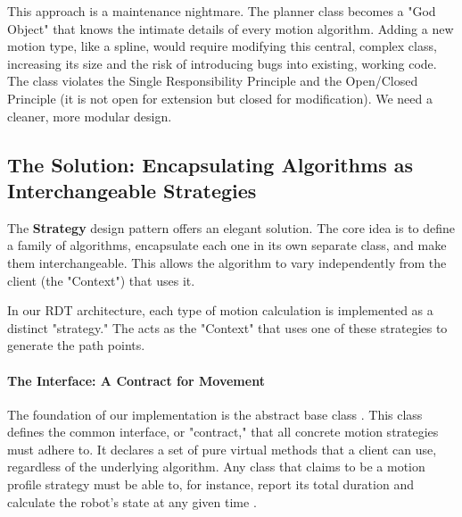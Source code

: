 This approach is a maintenance nightmare. The planner class becomes a "God Object" that knows the intimate details of every motion algorithm. Adding a new motion type, like a spline, would require modifying this central, complex class, increasing its size and the risk of introducing bugs into existing, working code. The class violates the Single Responsibility Principle and the Open/Closed Principle (it is not open for extension but closed for modification). We need a cleaner, more modular design.

\subsection{The Solution: Encapsulating Algorithms as Interchangeable Strategies}
\label{subsec:strategy_pattern_solution}

The \textbf{Strategy} design pattern offers an elegant solution. The core idea is to define a family of algorithms, encapsulate each one in its own separate class, and make them interchangeable. This allows the algorithm to vary independently from the client (the "Context") that uses it.

In our RDT architecture, each type of motion calculation is implemented as a distinct "strategy." The  acts as the "Context" that uses one of these strategies to generate the path points.

\paragraph{The  Interface: A Contract for Movement}
The foundation of our implementation is the abstract base class \textbf{}. This class defines the common interface, or "contract," that all concrete motion strategies must adhere to. It declares a set of pure virtual methods that a client can use, regardless of the underlying algorithm. Any class that claims to be a motion profile strategy must be able to, for instance, report its total duration and calculate the robot's state at any given time .

